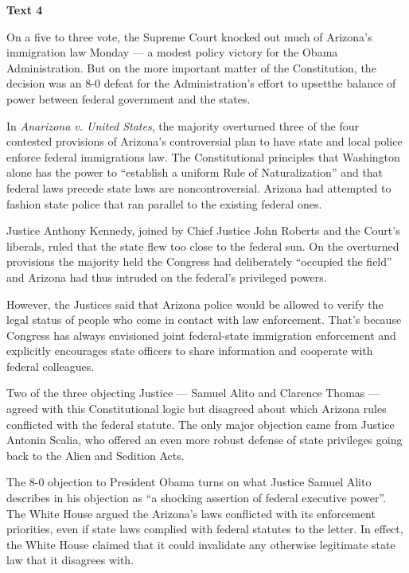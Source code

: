 
\begin{center}\textbf{Text 4}\end{center}

\qquad On a five to three vote, the Supreme Court knocked out much of Arizona's immigration law Monday --- a modest policy victory for the Obama Administration. But on the more important matter of the Constitution, the decision was an 8-0 defeat for the Administration's effort to upsetthe balance of power between federal government and the states.

\qquad In \emph{Anarizona v. United States}, the majority overturned three of the four contested provisions of Arizona's controversial plan to have state and local police enforce federal immigrations law. The Constitutional principles that Washington alone has the power to ``establish a uniform Rule of Naturalization'' and that federal laws precede state laws are noncontroversial. Arizona had attempted to fashion state police that ran parallel to the existing federal ones.

\qquad Justice Anthony Kennedy, joined by Chief Justice John Roberts and the Court's liberals, ruled that the state flew too close to the federal sun. On the overturned provisions the majority held the Congress had deliberately ``occupied the field'' and Arizona had thus intruded on the federal's privileged powers.

\qquad However, the Justices said that Arizona police would be allowed to verify the legal status of people who come in contact with law enforcement. That's because Congress has always envisioned joint federal-state immigration enforcement and explicitly encourages state officers to share information and cooperate with federal colleagues.

\qquad Two of the three objecting Justice --- Samuel Alito and Clarence Thomas --- agreed with this Constitutional logic but disagreed about which Arizona rules conflicted with the federal statute. The only major objection came from Justice Antonin Scalia, who offered an even more robust defense of state privileges going back to the Alien and Sedition Acts.

\qquad The 8-0 objection to President Obama turns on what Justice Samuel Alito describes in his objection as ``a shocking assertion of federal executive power''. The White House argued the Arizona's laws conflicted with its enforcement priorities, even if state laws complied with federal statutes to the letter. In effect, the White House claimed that it could invalidate any otherwise legitimate state law that it disagrees with.

